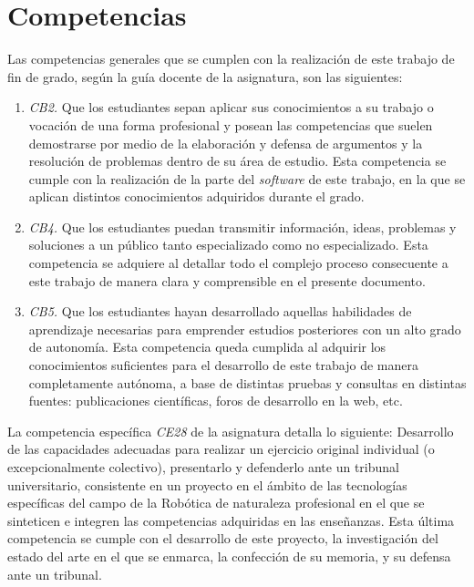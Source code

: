 \section{Competencias}
\label{sec:requisitos}

Las competencias generales que se cumplen con la realización de este trabajo de
fin de grado, según la guía docente de la asignatura, son las siguientes:

\begin{enumerate}
    \item{\textit{CB2.} Que los estudiantes sepan aplicar sus conocimientos a su
        trabajo o vocación de una forma profesional y posean las competencias
        que suelen demostrarse por medio de la elaboración y defensa de
        argumentos y la resolución de problemas dentro de su área de estudio.}
        Esta competencia se cumple con la realización de la parte del
        \textit{software} de este trabajo, en la que se aplican distintos
        conocimientos adquiridos durante el grado.
    \item{\textit{CB4.} Que los estudiantes puedan transmitir información,
        ideas, problemas y soluciones a un público tanto especializado como no
        especializado.}
        Esta competencia se adquiere al detallar todo el complejo proceso
        consecuente a este trabajo de manera clara y comprensible en el presente
        documento.
    \item{\textit{CB5.} Que los estudiantes hayan desarrollado aquellas
        habilidades de aprendizaje necesarias para emprender estudios
        posteriores con un alto grado de autonomía.}
        Esta competencia queda cumplida al adquirir los conocimientos
        suficientes para el desarrollo de este trabajo de manera completamente
        autónoma, a base de distintas pruebas y consultas en distintas fuentes:
        publicaciones científicas, foros de desarrollo en la web, etc.
\end{enumerate}

La competencia específica \textit{CE28} de la asignatura detalla lo
siguiente:
Desarrollo de las capacidades adecuadas para realizar un ejercicio original
individual (o excepcionalmente colectivo), presentarlo y defenderlo ante un
tribunal universitario, consistente en un proyecto en el ámbito de las
tecnologías específicas del campo de la Robótica de naturaleza profesional en el
que se sinteticen e integren las competencias adquiridas en las enseñanzas.
Esta última competencia se cumple con el desarrollo de este proyecto, la
investigación  del estado del arte en el que se enmarca, la confección de su
memoria, y su defensa ante un tribunal.

